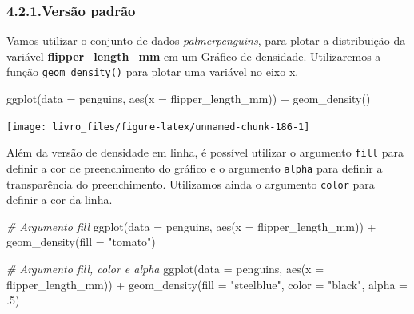 \documentclass[
]{book}
\newenvironment{Shaded}{\begin{snugshade}}{\end{snugshade}}
\newcommand{\AttributeTok}[1]{\textcolor[rgb]{0.61,0.61,0.61}{#1}}
\newcommand{\CommentTok}[1]{\textcolor[rgb]{0.37,0.37,0.37}{\textit{#1}}}
\newcommand{\DecValTok}[1]{\textcolor[rgb]{0.06,0.06,0.06}{#1}}
\newcommand{\FunctionTok}[1]{\textcolor[rgb]{0,0,0}{#1}}
\newcommand{\NormalTok}[1]{#1}
\newcommand{\SpecialCharTok}[1]{\textcolor[rgb]{0,0,0}{#1}}
\newcommand{\StringTok}[1]{\textcolor[rgb]{0.5,0.5,0.5}{#1}}
\begin{document}
\hypertarget{versuxe3o-padruxe3o-1}{%
\subsubsection{4.2.1.Versão padrão}\label{versuxe3o-padruxe3o-1}}

Vamos utilizar o conjunto de dados \emph{palmerpenguins}, para plotar a distribuição da variável \textbf{flipper\_length\_mm} em um Gráfico de densidade. Utilizaremos a função \texttt{geom\_density()} para plotar uma variável no eixo x.

\begin{Shaded}
\begin{Highlighting}[]

\FunctionTok{ggplot}\NormalTok{(}\AttributeTok{data =}\NormalTok{ penguins, }
       \FunctionTok{aes}\NormalTok{(}\AttributeTok{x =}\NormalTok{ flipper\_length\_mm)) }\SpecialCharTok{+}
  \FunctionTok{geom\_density}\NormalTok{()}
\end{Highlighting}
\end{Shaded}

\begin{center}\texttt{[image: livro\_files/figure-latex/unnamed-chunk-186-1]} \end{center}

Além da versão de densidade em linha, é possível utilizar o argumento \texttt{fill} para definir a cor de preenchimento do gráfico e o argumento \texttt{alpha} para definir a transparência do preenchimento. Utilizamos ainda o argumento \texttt{color} para definir a cor da linha.

\begin{Shaded}
\begin{Highlighting}[]

\CommentTok{\# Argumento fill}
\FunctionTok{ggplot}\NormalTok{(}\AttributeTok{data =}\NormalTok{ penguins, }
       \FunctionTok{aes}\NormalTok{(}\AttributeTok{x =}\NormalTok{ flipper\_length\_mm)) }\SpecialCharTok{+}
  \FunctionTok{geom\_density}\NormalTok{(}\AttributeTok{fill =} \StringTok{"tomato"}\NormalTok{)}

\CommentTok{\# Argumento fill, color e alpha}
\FunctionTok{ggplot}\NormalTok{(}\AttributeTok{data =}\NormalTok{ penguins, }
       \FunctionTok{aes}\NormalTok{(}\AttributeTok{x =}\NormalTok{ flipper\_length\_mm)) }\SpecialCharTok{+}
  \FunctionTok{geom\_density}\NormalTok{(}\AttributeTok{fill =} \StringTok{"steelblue"}\NormalTok{, }
               \AttributeTok{color =} \StringTok{"black"}\NormalTok{, }
               \AttributeTok{alpha =}\NormalTok{ .}\DecValTok{5}\NormalTok{)}
\end{Highlighting}
\end{Shaded}
\end{document}
